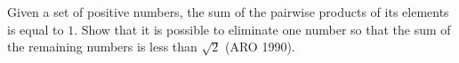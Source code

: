 Given a set of positive numbers, the sum of the pairwise products of its elements is equal to $1$. Show that it is possible to eliminate one number so that the sum of the remaining numbers is less than $\sqrt{2}$ (ARO 1990).
